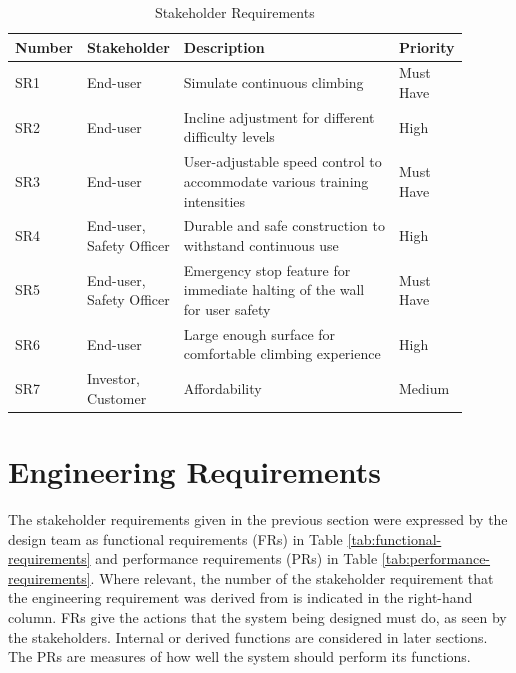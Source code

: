 \begin{table}[H]
\centering
\caption{Stakeholder Requirements}
\label{tab:stakeholder-requirements}
\begin{tabular}{|>{\centering\arraybackslash}p{0.12\linewidth}|>{\raggedright\arraybackslash}p{0.17\linewidth}|>{\raggedright\arraybackslash}p{0.5\linewidth}|>{\centering\arraybackslash}p{0.11\linewidth}|}
\hline
\textbf{Number}  & \textbf{Stakeholder} & \textbf{Description} & \textbf{Priority} \\
\hline
SR1  & End-user & Simulate continuous climbing & Must Have \\
SR2  & End-user & Incline adjustment for different difficulty levels & High \\
SR3  & End-user & User-adjustable speed control to accommodate various training intensities & Must Have \\
SR4  & End-user, Safety Officer & Durable and safe construction to withstand continuous use & High \\
SR5  & End-user, Safety Officer & Emergency stop feature for immediate halting of the wall for user safety & Must Have \\
SR6  & End-user & Large enough surface for comfortable climbing experience & High \\
SR7 & Investor, Customer & Affordability & Medium \\
\hline
\end{tabular}
\end{table}

\section{Engineering Requirements}

The stakeholder requirements given in the previous section were expressed by the design team as functional requirements (FRs) in Table \ref{tab:functional-requirements} and performance requirements (PRs) in Table \ref{tab:performance-requirements}. Where relevant, the number of the stakeholder requirement that the engineering requirement was derived from is indicated in the right-hand column. FRs give the actions that the system being designed must do, as seen by the stakeholders. Internal or derived functions are considered in later sections. The PRs are measures of how well the system should perform its functions.

